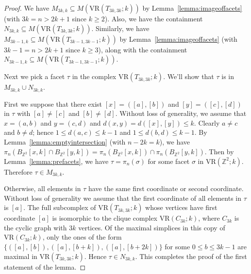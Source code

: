 \documentclass[12pt,a4paper]{amsart}
\theoremstyle{definition}
\newcommand{\Z}{\ensuremath{\mathbb{Z}}}
\newcommand{\vr}[2]{\mathrm{VR}(#1;#2)}
\numberwithin{equation}{section}
\begin{document}
\begin{proof}
We have $M_{3k,k}\subseteq M(\vr{T_{3k,3k}}{k})$ by Lemma~\ref{lemma:imageoffacets} (with $3k=n>2k+1$ since $k\ge 2$).
Also, we have the containment $N_{3k,k}\subseteq M(\vr{T_{3k,3k}}{k})$.
Similarly, we have $M_{3k-1,k}\subseteq M(\vr{T_{3k-1,3k-1}}{k})$ by Lemma~\ref{lemma:imageoffacets} (with $3k-1=n>2k+1$ since $k\ge 3$), along with the containment $N_{3k-1,k}\subseteq M(\vr{T_{3k-1,3k-1}}{k})$.

Next we pick a facet $\tau$ in the complex $\vr{T_{3k,3k}}{k}$.
We'll show that $\tau$ is in $M_{3k,k}\cup N_{3k,k}$.

First we suppose that there exist $[x] =([a], [b])$ and $[y]=([c], [d])$ in $\tau$ with $[a]\neq [c]$ and $[b]\neq [d]$.
Without loss of generality, we assume that $x=(a, b)$ and $y=(c, d)$ and $d(x, y)=d([x], [y])\le k$.
Clearly $a\neq c$ and $b\neq d$; hence $1\leq d(a, c)\leq k-1$ and $1\leq d(b, d)\leq k-1$.
By Lemma~\ref{lemma:emptyintersection} (with $n-2k=k$), we have $\pi_n (B_{\Z^2}[x, k]\cap B_{\Z^2}[y, k]) =\pi_n(B_{\Z^2}[x, k]) \cap \pi_n(B_{\Z^2}[y, k])$.
Then by Lemma~\ref{lemma:prefacets}, we have $\tau=\pi_n(\sigma)$ for some facet $\sigma$ in $\vr{\Z^2}{k}$.
Therefore $\tau\in M_{3k,k}$.


Otherwise, all elements in $\tau$ have the same first coordinate or second coordinate.
Without loss of generality we assume that the first coordinate of all elements in $\tau$ is $[a]$.
The full subcomplex of $\vr{T_{3k,3k}}{k}$ whose vertices have first coordinate $[a]$ is isomorphic to the clique complex $\vr{C_{3k}}{k}$, where $C_{3k}$ is the cyclic graph with $3k$ vertices.
Of the maximal simplices in this copy of $\vr{C_{3k}}{k}$, only the ones of the form $\{([a], [b]), ([a], [b+k]), ([a], [b+2k])\}$ for some $0\leq b\leq 3k-1$ are maximal in $\vr{T_{3k,3k}}{k}$.
Hence $\tau\in N_{3k,k}$.
This completes the proof of the first statement of the lemma. 

\medskip 


\end{proof}
\end{document}
